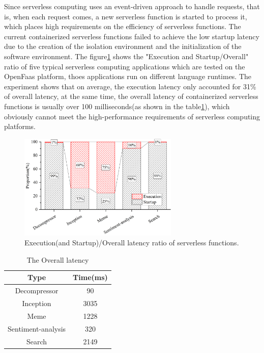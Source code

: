 Since serverless computing uses an event-driven approach to handle requests,
that is, when each request comes,
a new serverless function is started to process it,
which places high requirements on the efficiency of serverless functions.
The current containerized serverless functions failed to achieve the low startup
latency due to the creation of the isolation environment and the initialization
of the software environment.
The figure\ref{default-proportion} shows the "Execution and Startup/Overall" ratio of five typical serverless
computing applications which are tested on the OpenFaas platform, thoes applications run on different language runtimes.
The experiment shows that on average, the execution latency only accounted for 31\% of overall latency,
at the same time, the overall latency of containerized serverless functions is usually over 100 milliseconds(as shown in the table\ref{overall-latency}),
which obviously cannot meet the high-performance requirements of serverless computing platforms.
\begin{figure}[t]
    \centering
    \includegraphics[width=3in]{images/default-proportion.png}
    \caption{Execution(and Startup)/Overall latency ratio of serverless functions.}
    \label{default-proportion}
\end{figure}

\begin{table}[htbp]
    \centering
    \caption{The Overall latency}
    \begin{tabular}{cc}
        \hline
        Type               & Time(ms) \\ \hline
        Decompressor       & 90       \\
        Inception          & 3035     \\
        Meme               & 1228     \\
        Sentiment-analysis & 320      \\
        Search             & 2149     \\ \hline
    \end{tabular}
    \label{overall-latency}
\end{table}

